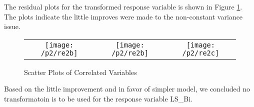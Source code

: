 \documentclass{article}
\begin{document}
The residual plots for the transformed response variable is shown in Figure \ref{residTrans}. The plots indicate the little improves were made to the non-constant variance issue.\\

\begin{figure}
\begin{tabular}{c c c}
\begin{minipage}{.33\textwidth}
\centering
\texttt{[image: /p2/re2b]}
\end{minipage}
&
\begin{minipage}{.33\textwidth}
\centering
\texttt{[image: /p2/re2b]}
\end{minipage}
&
\begin{minipage}{.33\textwidth}
\centering
\texttt{[image: /p2/re2c]}
\end{minipage}
\end{tabular}
\caption {Scatter Plots of Correlated Variables} \label{residTrans} 
\end{figure}
Based on the little improvement and in favor of simpler model, we concluded no transformatoin is to be used for the response variable LS\_Bi.\\




\end{document}

